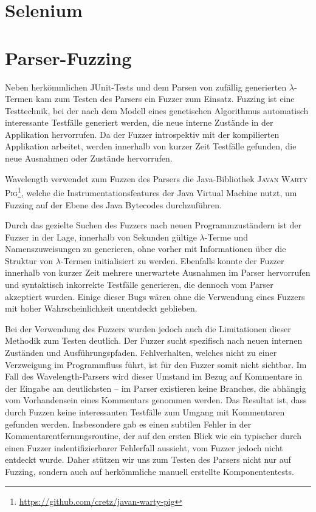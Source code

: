 \documentclass[parskip=full,11pt,openany]{scrreprt}
\begin{document}
\section{Selenium}

\section{Parser-Fuzzing}
Neben herkömmlichen JUnit-Tests und dem Parsen von zufällig generierten
$\lambda$-Termen kam zum Testen des Parsers ein Fuzzer zum Einsatz. Fuzzing ist
eine Testtechnik, bei der nach dem Modell eines genetischen Algorithmus
automatisch interessante Testfälle generiert werden, die neue interne Zustände
in der Applikation hervorrufen. Da der Fuzzer introspektiv mit der kompilierten
Applikation arbeitet, werden innerhalb von kurzer Zeit Testfälle gefunden, die
neue Ausnahmen oder Zustände hervorrufen.

Wavelength verwendet zum Fuzzen des Parsers die Java-Bibliothek
\textsc{Javan Warty Pig\footnote{\url{https://github.com/cretz/javan-warty-pig}}},
welche die Instrumentationsfeatures der Java Virtual Machine nutzt, um Fuzzing
auf der Ebene des Java Bytecodes durchzuführen.

Durch das gezielte Suchen des Fuzzers nach neuen Programmzuständern ist der
Fuzzer in der Lage, innerhalb von Sekunden gültige $\lambda$-Terme und
Namenszuweisungen zu generieren, ohne vorher mit Informationen über die Struktur
von $\lambda$-Termen initialisiert zu werden. Ebenfalls konnte der Fuzzer innerhalb
von kurzer Zeit mehrere unerwartete Ausnahmen im Parser hervorrufen und syntaktisch
inkorrekte Testfälle generieren, die dennoch vom Parser akzeptiert wurden. Einige
dieser Bugs wären ohne die Verwendung eines Fuzzers mit hoher Wahrscheinlichkeit
unentdeckt geblieben.

Bei der Verwendung des Fuzzers wurden jedoch auch die Limitationen dieser Methodik
zum Testen deutlich. Der Fuzzer sucht spezifisch nach neuen internen Zuständen und
Ausführungspfaden. Fehlverhalten, welches nicht zu einer Verzweigung im
Programmfluss führt, ist für den Fuzzer somit nicht sichtbar. Im Fall des
Wavelength-Parsers wird dieser Umstand im Bezug auf Kommentare in der Eingabe
am deutlichsten -- im Parser existieren keine Branches, die abhängig vom
Vorhandensein eines Kommentars genommen werden. Das Resultat ist, dass durch
Fuzzen keine interessanten Testfälle zum Umgang mit Kommentaren gefunden werden.
Insbesondere gab es einen subtilen Fehler in der Kommentarentfernungsroutine,
der auf den ersten Blick wie ein typischer durch einen Fuzzer indentifizierbarer
Fehlerfall aussieht, vom Fuzzer jedoch nicht entdeckt wurde. Daher stützen wir
uns zum Testen des Parsers nicht nur auf Fuzzing, sondern auch auf herkömmliche
manuell erstellte Komponententests.
\end{document}
